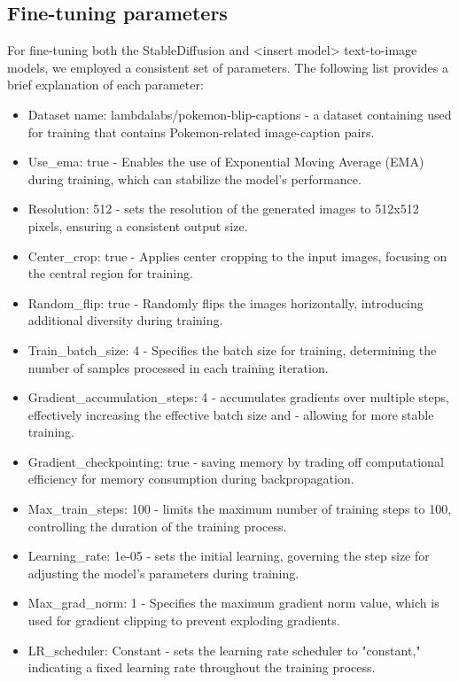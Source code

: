 \documentclass[conference]{IEEEtran}
\begin{document}
\subsection{Fine-tuning parameters}
For fine-tuning both the StableDiffusion and <insert model> text-to-image models, we employed a consistent set of parameters. The following list provides a brief explanation of each parameter:\begin{itemize}
\item{Dataset name: lambdalabs/pokemon-blip-captions - a dataset containing used for training that contains Pokemon-related image-caption pairs.}
\item{Use\_ema: true - Enables the use of Exponential Moving Average (EMA) during training, which can stabilize the model's performance.}
\item{Resolution: 512 - sets the resolution of the generated images to 512x512 pixels, ensuring a consistent output size.}
\item{Center\_crop: true - Applies center cropping to the input images, focusing on the central region for training.}
\item{Random\_flip: true - Randomly flips the images horizontally, introducing additional diversity during training.}
\item{Train\_batch\_size: 4 - Specifies the batch size for training, determining the number of samples processed in each training iteration.}
\item{Gradient\_accumulation\_steps: 4 - accumulates gradients over multiple steps, effectively increasing the effective batch size and - allowing for more stable training.}
\item{Gradient\_checkpointing: true - saving memory by trading off computational efficiency for memory consumption during backpropagation.}
\item{Max\_train\_steps: 100 - limits the maximum number of training steps to 100, controlling the duration of the training process.}
\item{Learning\_rate: 1e-05 - sets the initial learning, governing the step size for adjusting the model's parameters during training.}
\item{Max\_grad\_norm: 1 - Specifies the maximum gradient norm value, which is used for gradient clipping to prevent exploding gradients.}
\item{LR\_scheduler: Constant - sets the learning rate scheduler to "constant," indicating a fixed learning rate throughout the training process.}
\end{itemize}
\end{document}
